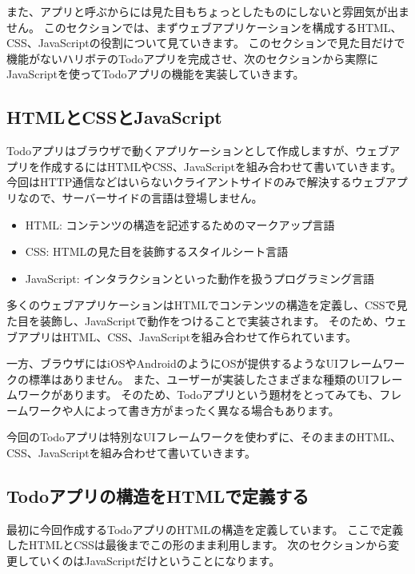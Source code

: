また、アプリと呼ぶからには見た目もちょっとしたものにしないと雰囲気が出ません。
このセクションでは、まずウェブアプリケーションを構成するHTML、CSS、JavaScriptの役割について見ていきます。
このセクションで見た目だけで機能がないハリボテのTodoアプリを完成させ、次のセクションから実際にJavaScriptを使ってTodoアプリの機能を実装していきます。

\hypertarget{html-css-javascript}{%
\subsection{HTMLとCSSとJavaScript}\label{html-css-javascript}}

Todoアプリはブラウザで動くアプリケーションとして作成しますが、ウェブアプリを作成するにはHTMLやCSS、JavaScriptを組み合わせて書いていきます。
今回はHTTP通信などはいらないクライアントサイドのみで解決するウェブアプリなので、サーバーサイドの言語は登場しません。

\begin{itemize}
\item
  HTML: コンテンツの構造を記述するためのマークアップ言語
\item
  CSS: HTMLの見た目を装飾するスタイルシート言語
\item
  JavaScript: インタラクションといった動作を扱うプログラミング言語
\end{itemize}

多くのウェブアプリケーションはHTMLでコンテンツの構造を定義し、CSSで見た目を装飾し、JavaScriptで動作をつけることで実装されます。
そのため、ウェブアプリはHTML、CSS、JavaScriptを組み合わせて作られています。

一方、ブラウザにはiOSやAndroidのようにOSが提供するようなUIフレームワークの標準はありません。
また、ユーザーが実装したさまざまな種類のUIフレームワークがあります。
そのため、Todoアプリという題材をとってみても、フレームワークや人によって書き方がまったく異なる場合もあります。

今回のTodoアプリは特別なUIフレームワークを使わずに、そのままのHTML、CSS、JavaScriptを組み合わせて書いていきます。

\hypertarget{todo-html}{%
\subsection{Todoアプリの構造をHTMLで定義する}\label{todo-html}}

最初に今回作成するTodoアプリのHTMLの構造を定義しています。
ここで定義したHTMLとCSSは最後までこの形のまま利用します。
次のセクションから変更していくのはJavaScriptだけということになります。

